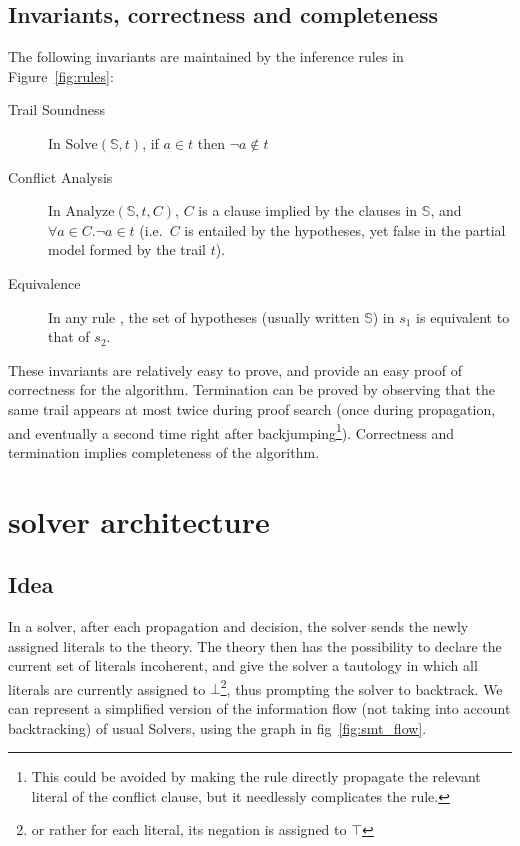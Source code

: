 \documentclass{article}
\begin{document}
\subsection{Invariants, correctness and completeness}

The following invariants are maintained by the inference rules in Figure~\ref{fig:rules}:
\begin{description}
  \item[Trail Soundness] In $\text{Solve}(\mathbb{S}, t)$, if $a \in t$ then $\neg a \notin t$
  \item[Conflict Analysis] In $\text{Analyze}(\mathbb{S}, t, C)$, $C$ is a clause implied by the
    clauses in $\mathbb{S}$, and $\forall a \in C. \neg a \in t$ (i.e.~$C$ is entailed by the
    hypotheses, yet false in the partial model formed by the trail $t$).
  \item[Equivalence] In any rule \DP{}, the set of hypotheses
    (usually written $\mathbb{S}$) in $s_1$ is equivalent to that of $s_2$.
\end{description}

These invariants are relatively easy to prove, and provide an easy proof of correctness for
the \cdcl{} algorithm. Termination can be proved by observing that the same trail appears
at most twice during proof search (once during propagation, and eventually a second time
right after backjumping\footnote{This could be avoided by making the  rule
directly propagate the relevant literal of the conflict clause, but it needlessly
complicates the rule.}). Correctness and termination implies completeness of the \sat{}
algorithm.


\section{\smt{} solver architecture}\label{sec:smt}

\subsection{Idea}\label{sec:smt_flow}

In a \smt{} solver, after each propagation and decision, the solver sends the newly
assigned literals to the theory. The theory then has the possibility to declare the
current set of literals incoherent, and give the solver a tautology in which all
literals are currently assigned to $\bot$\footnote{or rather for each literal, its negation
is assigned to $\top$}, thus prompting the solver to backtrack.
We can represent a simplified version of the information flow (not taking into
account backtracking) of usual \smt{} Solvers, using the graph in fig~\ref{fig:smt_flow}.
\end{document}
